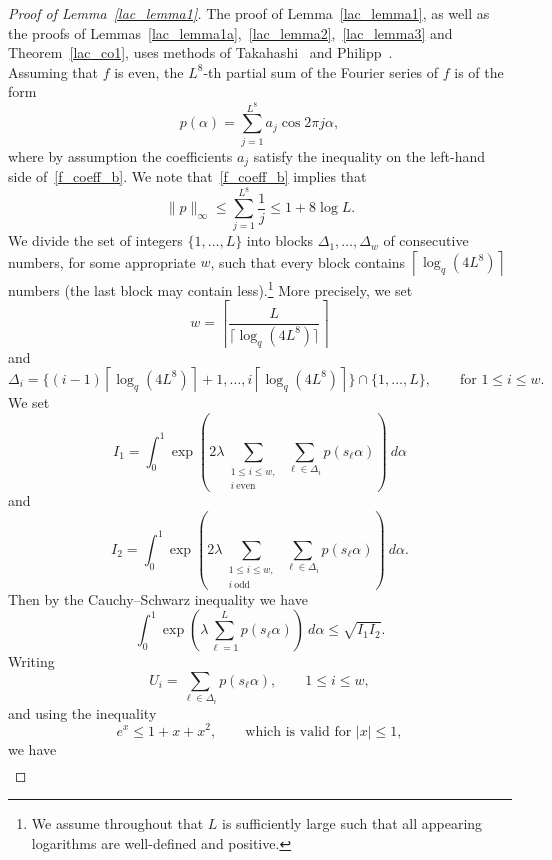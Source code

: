\documentclass[12pt]{amsart}
\begin{document}
\begin{proof}[Proof of Lemma~\ref{lac_lemma1}] 
The proof of Lemma~\ref{lac_lemma1}, as well as the proofs of Lemmas~\ref{lac_lemma1a},~\ref{lac_lemma2},~\ref{lac_lemma3} and Theorem~\ref{lac_co1}, uses methods of Takahashi~\cite{taka} and Philipp~\cite{philipp}.\\

Assuming that $f$ is even, the $L^{8}$-th partial sum of the Fourier series of $f$ is of the form
$$
p(\alpha) = \sum_{j=1}^{L^8} a_j \cos 2 \pi j \alpha,
$$
where by assumption the coefficients $a_j$ satisfy the inequality on the left-hand side of~\eqref{f_coeff_b}. We note that~\eqref{f_coeff_b} implies that
\begin{equation} \label{pinf}
\|p\|_\infty \leq \sum_{j=1}^{L^8} \frac{1}{j} \leq 1+ 8\log L.
\end{equation}
We divide the set of integers $\{1, \dots, L\}$ into blocks $\Delta_1, \dots, \Delta_w$ of consecutive numbers, for some appropriate $w$, such that every block contains $\left\lceil \log_q \left(4 L^8\right) \right\rceil$ numbers (the last block may contain less).\footnote{We assume throughout that $L$ is sufficiently large such that all appearing logarithms are well-defined and positive.} More precisely, we set 
$$
w = \left\lceil \frac{L}{\lceil \log_q \left(4 L^8\right) \rceil} \right\rceil
$$ 
and
$$
\Delta_i = \Big\{ (i-1) \left\lceil \log_q \left(4 L^8\right) \right\rceil + 1, \dots, i \left\lceil \log_q (4 L^8) \right\rceil \Big\} \cap \{1, \dots, L\}, \qquad \textrm{for $1 \leq i \leq w$}.
$$
We set
$$
I_1 = \int_0^1 \exp \left( 2 \lambda \sum_{\substack{1 \leq i \leq w,\\ i ~\textrm{even}}} ~\sum_{\ell \in \Delta_i} p(s_\ell \alpha) \right) ~d\alpha
$$
and
$$
I_2 = \int_0^1 \exp \left( 2 \lambda \sum_{\substack{1 \leq i \leq w,\\ i ~\textrm{odd}}} ~\sum_{\ell \in \Delta_i} p(s_\ell \alpha) \right) ~d\alpha.
$$
Then by the Cauchy--Schwarz inequality we have
\begin{equation} \label{i1i2}
\int_0^1 \exp\left(\lambda \sum_{\ell=1}^{L} p(s_\ell \alpha) \right) ~d\alpha \leq \sqrt{I_1 I_2}.
\end{equation}
Writing 
\begin{equation*} \label{ui}
U_i = \sum_{\ell \in \Delta_i} p(s_\ell \alpha), \qquad 1 \leq i \leq w,
\end{equation*}
and using the inequality
$$
e^x \leq 1 + x + x^2, \qquad \textrm{which is valid for $|x| \leq 1$}, 
$$
we have
\begin{eqnarray}

\end{eqnarray}
\end{proof}
\end{document}
